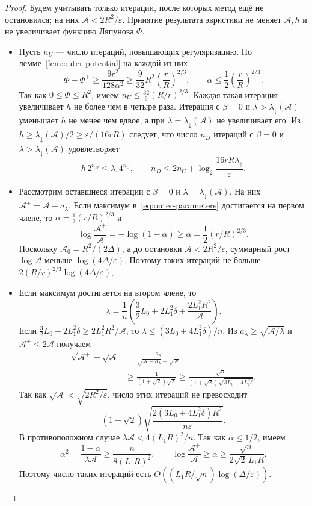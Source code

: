 \begin{proof}
Будем учитывать только итерации, после которых метод ещё не остановился;
на них $\mathcal A<2R^2/\varepsilon$.
Принятие результата эвристики не меняет $\mathcal A,h$
и не увеличивает функцию Ляпунова $\Phi$.

\begin{itemize}
\item Пусть $n_U$ --- число итераций, повышающих регуляризацию.
По лемме~\ref{lem:outer-potential} на каждой из них
\[
 \Phi-\Phi^+\ge\frac{9r^2}{128\alpha^2}
 \ge\frac9{32}R^2\left(\frac rR\right)^{2/3},
 \qquad \alpha\le\frac12\left(\frac rR\right)^{2/3}.
\]
Так как $0\le\Phi\le R^2$, имеем $n_U\le\frac{32}{9}(R/r)^{2/3}$.
Каждая такая итерация увеличивает $h$ не более чем в четыре раза.
Итерация с $\beta=0$ и $\lambda>\lambda_\downarrow(\mathcal A)$
уменьшает $h$ не менее чем вдвое, а при
$\lambda=\lambda_\downarrow(\mathcal A)$ не увеличивает его. Из
$h\ge\lambda_\downarrow(\mathcal A)/2\ge\varepsilon/(16rR)$
следует, что число $n_D$ итераций с $\beta=0$ и
$\lambda>\lambda_\downarrow(\mathcal A)$ удовлетворяет
\[
 h\,2^{n_D}\le\lambda_{\uparrow}4^{n_U},\qquad
 n_D\le2n_U+\log_2\frac{16rR\lambda_{\uparrow}}\varepsilon.
\]

\item Рассмотрим оставшиеся итерации с $\beta=0$ и
$\lambda=\lambda_\downarrow(\mathcal A)$.
На них $\mathcal A^+=\mathcal A+a_\lambda$.
Если максимум в~\eqref{eq:outer-parameters} достигается на первом члене,
то $\alpha=\frac12(r/R)^{2/3}$ и
\[
 \log\frac{\mathcal A^+}{\mathcal A}
 =-\log(1-\alpha)\ge\alpha=\frac12(r/R)^{2/3}.
\]
Поскольку $\mathcal A_0=R^2/(2\Delta)$, а до остановки
$\mathcal A<2R^2/\varepsilon$, суммарный рост $\log\mathcal A$
меньше $\log(4\Delta/\varepsilon)$. Поэтому таких итераций не больше
$2(R/r)^{2/3}\log(4\Delta/\varepsilon)$.

\item Если максимум достигается на втором члене, то
\[
 \lambda=\frac1n\left(\frac32L_0+2L_1^2\delta
                       +\frac{2L_1^2R^2}{\mathcal A}\right).
\]
Если $\frac32L_0+2L_1^2\delta\ge2L_1^2R^2/\mathcal A$, то
$\lambda\le(3L_0+4L_1^2\delta)/n$.
Из $a_\lambda\ge\sqrt{\mathcal A/\lambda}$ и
$\mathcal A^+\le2\mathcal A$ получаем
\[
 \begin{aligned}
 \sqrt{\mathcal A^+}-\sqrt{\mathcal A}
 &=\frac{a_\lambda}{\sqrt{\mathcal A+a_\lambda}+\sqrt{\mathcal A}}\\
 &\ge\frac1{(1+\sqrt2)\sqrt\lambda}
 \ge\frac{\sqrt n}{(1+\sqrt2)\sqrt{3L_0+4L_1^2\delta}}.
 \end{aligned}
\]
Так как $\sqrt{\mathcal A}<\sqrt{2R^2/\varepsilon}$, число этих итераций
не превосходит
\[
 (1+\sqrt2)\sqrt{\frac{2(3L_0+4L_1^2\delta)R^2}{n\varepsilon}}.
\]
В противоположном случае $\lambda\mathcal A<4(L_1R)^2/n$.
Так как $\alpha\le1/2$, имеем
\[
 \alpha^2=\frac{1-\alpha}{\lambda\mathcal A}
 \ge\frac n{8(L_1R)^2},\qquad
 \log\frac{\mathcal A^+}{\mathcal A}\ge\alpha
 \ge\frac{\sqrt n}{2\sqrt2\,L_1R}.
\]
Поэтому число таких итераций есть
$O((L_1R/\sqrt n)\log(\Delta/\varepsilon))$.


\end{itemize}
\end{proof}
